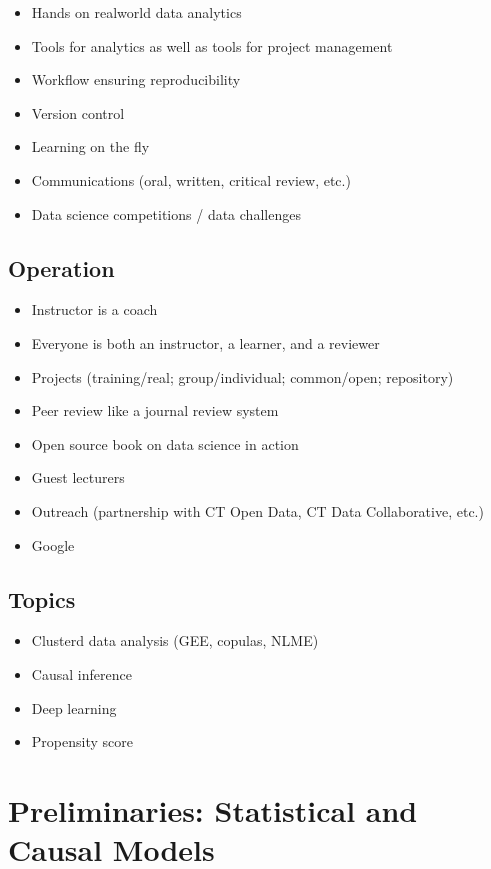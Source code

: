 \documentclass[]{article}
\begin{document}
\begin{itemize}
\item
  Hands on realworld data analytics
\item
  Tools for analytics as well as tools for project management
\item
  Workflow ensuring reproducibility
\item
  Version control
\item
  Learning on the fly
\item
  Communications (oral, written, critical review, etc.)
\item
  Data science competitions / data challenges
\end{itemize}

\subsection{Operation}\label{operation}

\begin{itemize}
\item
  Instructor is a coach
\item
  Everyone is both an instructor, a learner, and a reviewer
\item
  Projects (training/real; group/individual; common/open; repository)
\item
  Peer review like a journal review system
\item
  Open source book on data science in action
\item
  Guest lecturers
\item
  Outreach (partnership with CT Open Data, CT Data Collaborative, etc.)
\item
  Google
\end{itemize}

\subsection{Topics}\label{topics}

\begin{itemize}
\item
  Clusterd data analysis (GEE, copulas, NLME)
\item
  Causal inference
\item
  Deep learning
\item
  Propensity score
\end{itemize}

\section{Preliminaries: Statistical and Causal
Models}\label{preliminaries-statistical-and-causal-models}
\end{document}
